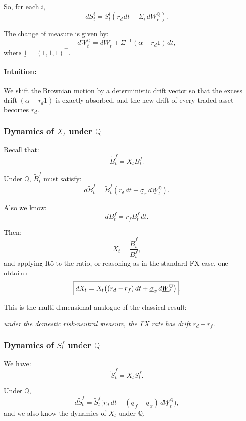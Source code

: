 \documentclass[12pt,a4paper]{article}
\theoremstyle{definition}
\begin{document}
So, for each $i$,
\[
dS_t^i = S_t^i(r_d\, dt + \underline{\Sigma}_i\, d\underline{W}_t^\mathbb{Q}).
\]

The change of measure is given by:
\[
d\underline{W}_t^\mathbb{Q} = d\underline{W}_t + \underline{\Sigma}^{-1}(\underline{\alpha} - r_d \underline{1})\, dt,
\]
where $\underline{1} = (1, 1, 1)^\top$.

\paragraph{Intuition:}

We shift the Brownian motion by a deterministic drift vector so that the excess drift $(\underline{\alpha} - r_d \underline{1})$ is exactly absorbed, and the new drift of every traded asset becomes $r_d$.

\subsubsection{Dynamics of $X_t$ under $\mathbb{Q}$}

Recall that:
\[
\widetilde{B}_t^f = X_t B_t^f.
\]

Under $\mathbb{Q}$, $\widetilde{B}_t^f$ must satisfy:
\[
d\widetilde{B}_t^f = \widetilde{B}_t^f(r_d\, dt + \underline{\sigma}_x\, d\underline{W}_t^\mathbb{Q}).
\]

Also we know:
\[
dB_t^f = r_f B_t^f\, dt.
\]

Then:
\[
X_t = \frac{\widetilde{B}_t^f}{B_t^f},
\]
and applying Itô to the ratio, or reasoning as in the standard FX case, one obtains:
\[
\fbox{$dX_t = X_t\big((r_d - r_f)\, dt + \underline{\sigma}_x\, d\underline{W}_t^\mathbb{Q}\big)$}.
\]

This is the multi-dimensional analogue of the classical result:

\emph{under the domestic risk-neutral measure, the FX rate has drift $r_d - r_f$}.

\subsubsection{Dynamics of $S_t^f$ under $\mathbb{Q}$}

We have:
\[
\widetilde{S}_t^f = X_t S_t^f.
\]

Under $\mathbb{Q}$,
\[
d\widetilde{S}_t^f = \widetilde{S}_t^f\big(r_d\, dt + (\underline{\sigma}_f + \underline{\sigma}_x)\, d\underline{W}_t^\mathbb{Q}\big),
\]
and we also know the dynamics of $X_t$ under $\mathbb{Q}$.
\end{document}
